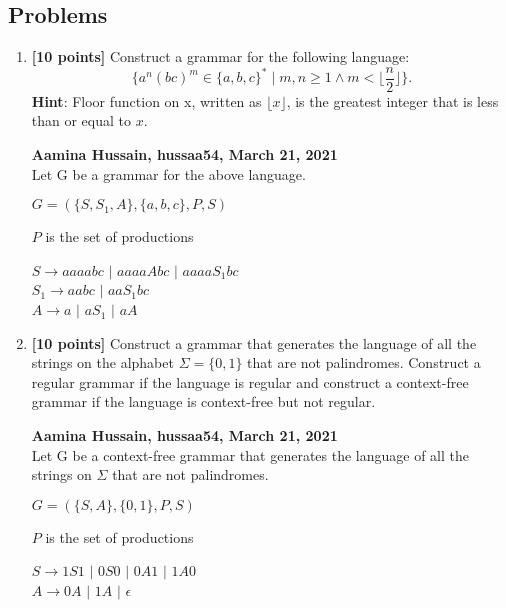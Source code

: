 \documentclass[11pt,fleqn]{article}
\newcommand{\be}{\begin{enumerate}}
\newcommand{\ee}{\end{enumerate}}
\begin{document}
\newpage

\subsection*{Problems}

\be

  \item \textbf{[10 points]} Construct a grammar for the following
    language: $$\Big\{a^n(bc)^m \in \{a,b,c\}^* \mid m,n \ge 1 \wedge
    m < \lfloor\frac{n}{2}\rfloor\Big\}.$$
	\textbf{Hint}: Floor function on x, written as $\lfloor x\rfloor$, is the greatest integer that is less than or equal to $x$.
	

  \bigskip

  \textbf{Aamina Hussain, hussaa54, March 21, 2021}\\
  Let G be a grammar for the above language.

  $G = (\{S, S_1, A\}, \{a, b, c\}, P, S)$

  $P$ is the set of productions

  $S \rightarrow aaaabc$ $|$ $aaaaAbc$ $|$ $aaaaS_1bc$\\
  $S_1 \rightarrow aabc$ $|$ $aaS_1bc$\\
  $A \rightarrow a$ $|$ $aS_1$ $|$ $aA$\\

  \bigskip

  \item \textbf{[10 points]} Construct a grammar that generates the
    language of all the strings on the alphabet $\Sigma = \{0,1\}$
    that are not palindromes.  Construct a regular grammar if the
    language is regular and construct a context-free grammar if the
    language is context-free but not regular.
  


  \bigskip

  \textbf{Aamina Hussain, hussaa54, March 21, 2021}\\
  Let G be a context-free grammar that generates the language of all the strings on $\Sigma$ that are not palindromes.

  $G = (\{S, A\}, \{0, 1\}, P, S)$

  $P$ is the set of productions

  $S \rightarrow 1S1$ $|$ $0S0$ $|$ $0A1$ $|$ $1A0$\\
  $A \rightarrow 0A$ $|$ $1A$ $|$ $\epsilon$\\

\ee
\end{document}
